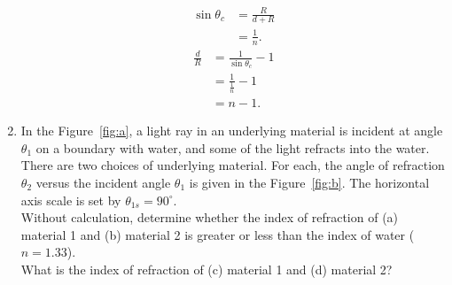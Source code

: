 \documentclass{zc-ust-hw}
\begin{document}
\begin{enumerate}
    \begin{figure}[htpb]
    \begin{center}
    \end{center}
    \caption{}%
    \label{fig:triangle}
    \end{figure}

    \begin{sol}
      \begin{align}
        \sin\theta_c &= \frac{R}{d+R} \\
                     &= \frac{1}{n}
      .\end{align}
      \begin{align}
        \frac{d}{R} &= \frac{1}{\sin\theta_c} - 1 \\
                    &= \frac{1}{\frac{1}{n}} - 1 \\
                    &= n - 1
      .\end{align}
    \end{sol}

    \newpage

  \item In the Figure~\ref{fig:a}, a light ray in an underlying material is
    incident at angle $\theta_1$ on a boundary with water, and some of the
    light refracts into the water. There are two choices of underlying
    material. For each, the angle of refraction $\theta_2$ versus the incident
    angle $\theta_1$ is given in the Figure~\ref{fig:b}. The horizontal axis
    scale is set by $\theta_{1s} = 90^{\circ}$. \\
    Without calculation, determine whether the index of refraction of (a)
    material 1 and (b) material 2 is greater or less than the index of water
    ($n = 1.33$). \\
    What is the index of refraction of (c) material 1 and (d) material 2?


\end{enumerate}
\end{document}
